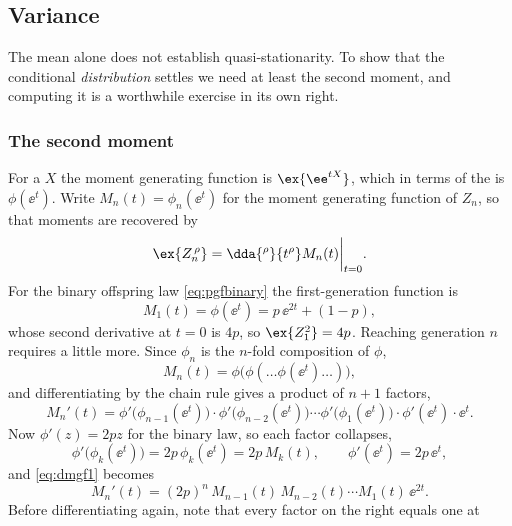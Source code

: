 \subsection{Variance}
\label{sec:variance}

The mean alone does not establish quasi-stationarity. To show that the conditional
\emph{distribution} settles we need at least the second moment, and computing it is
a worthwhile exercise in its own right.

\subsubsection{The second moment}

For a \rv{} $X$ the moment generating function is $\ex{\ee^{tX}}$, which in terms
of the \pgf{} is $\phi(\ee^t)$. Write $M_n(t) = \phi_n(\ee^t)$ for the moment
generating function of $Z_n$, so that moments are recovered by
\begin{equation}
\label{eq:mgfmoments}
\ex{Z_n^{\,\rho}} = \dda{^{\rho}}{t^{\rho}}M_n(t)\bigg|_{t=0} .
\end{equation}
For the binary offspring law \cref{eq:pgfbinary} the first-generation function is
\begin{equation}
\label{eq:mgf1}
M_1(t) = \phi(\ee^t) = p\,\ee^{2t} + (1-p),
\end{equation}
whose second derivative at $t=0$ is $4p$, so $\ex{Z_1^2}=4p$. Reaching generation
$n$ requires a little more. Since $\phi_n$ is the $n$-fold composition of $\phi$,
\begin{equation*}
M_n(t) = \phi\bigl(\phi(\dots\phi(\ee^t)\dots)\bigr),
\end{equation*}
and differentiating by the chain rule gives a product of $n+1$ factors,
\begin{equation}
\label{eq:dmgf1}
M_n'(t) = \phi'\bigl(\phi_{n-1}(\ee^t)\bigr)\cdot\phi'\bigl(\phi_{n-2}(\ee^t)\bigr)
\cdots\phi'\bigl(\phi_1(\ee^t)\bigr)\cdot\phi'(\ee^t)\cdot\ee^t .
\end{equation}
Now $\phi'(z) = 2pz$ for the binary law, so each factor collapses,
\begin{equation*}
\phi'\bigl(\phi_k(\ee^t)\bigr) = 2p\,\phi_k(\ee^t) = 2p\,M_k(t),
\qquad
\phi'(\ee^t) = 2p\,\ee^t ,
\end{equation*}
and \cref{eq:dmgf1} becomes
\begin{equation}
\label{eq:dmgf2}
M_n'(t) = (2p)^n\,M_{n-1}(t)\,M_{n-2}(t)\cdots M_1(t)\,\ee^{2t} .
\end{equation}
Before differentiating again, note that every factor on the right equals one at
